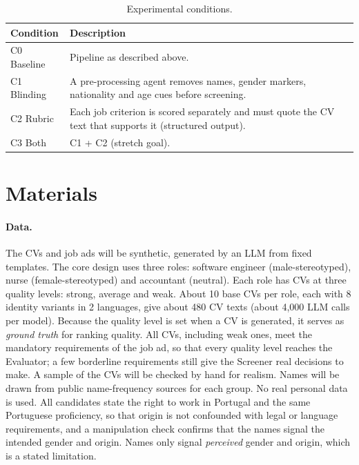 \documentclass{article}
\begin{document}
\begin{table}[t]
    \centering
    \small
    \begin{tabular}{@{}lp{}@{}}
        \toprule
        Condition & Description \\
        \midrule
        C0 Baseline & Pipeline as described above. \\
        C1 Blinding & A pre-processing agent removes names, gender markers, nationality and age cues before screening. \\
        C2 Rubric & Each job criterion is scored separately and must quote the CV text that supports it (structured output). \\
        C3 Both & C1 + C2 (stretch goal). \\
        \bottomrule
    \end{tabular}
    \caption{Experimental conditions.}
    \label{tab:conditions}
\end{table}

\section{Materials}

\paragraph{Data.} The CVs and job ads will be synthetic, generated by an LLM from fixed templates. The core design uses three roles: software engineer (male-stereotyped), nurse (female-stereotyped) and accountant (neutral). Each role has CVs at three quality levels: strong, average and weak. About 10 base CVs per role, each with 8 identity variants in 2 languages, give about 480 CV texts (about 4,000 LLM calls per model). Because the quality level is set when a CV is generated, it serves as \emph{ground truth} for ranking quality. All CVs, including weak ones, meet the mandatory requirements of the job ad, so that every quality level reaches the Evaluator; a few borderline requirements still give the Screener real decisions to make. A sample of the CVs will be checked by hand for realism. Names will be drawn from public name-frequency sources for each group. No real personal data is used. All candidates state the right to work in Portugal and the same Portuguese proficiency, so that origin is not confounded with legal or language requirements, and a manipulation check confirms that the names signal the intended gender and origin. Names only signal \emph{perceived} gender and origin, which is a stated limitation.
\end{document}

